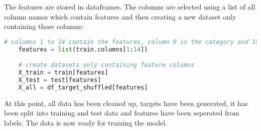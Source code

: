 The features are stored in dataframes. The columns are selected using a list of all column names which contain features
and then creating a new dataset only containing those columns:

\begin{lstlisting}[language=Python]
    # columns 1 to 14 contain the features, column 0 is the category and 15 the target
    features = list(train.columns[1:14])

    # create datasets only containing feature columns
    X_train = train[features]
    X_test = test[features]
    X_all = df_target_shuffled[features]
\end{lstlisting}

At this point, all data has been cleaned up, targets have been generated, it has been split into training and test data and
features have been seperated from labels. The data is now ready for training the model.